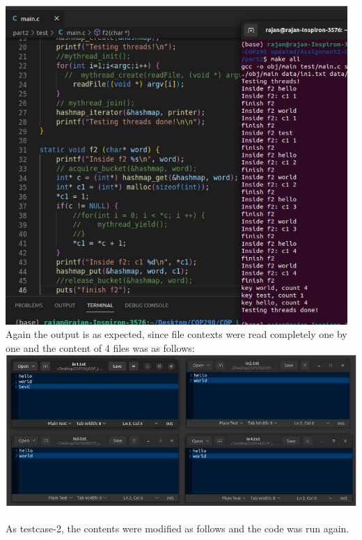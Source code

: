 \documentclass[12pt]{article}
\begin{document}
\begin{spacing}{1.2}
\includegraphics[width=16cm]{images/10.png}\\
Again the output is as expected, since file contexts were read completely one by one and the content of 4 files was as follows:\\
\includegraphics[width=14cm]{images/11.png}\\

    \newpage

As testcase-2, the contents were modified as follows and the code was run again.\\


\end{spacing}
\end{document}
